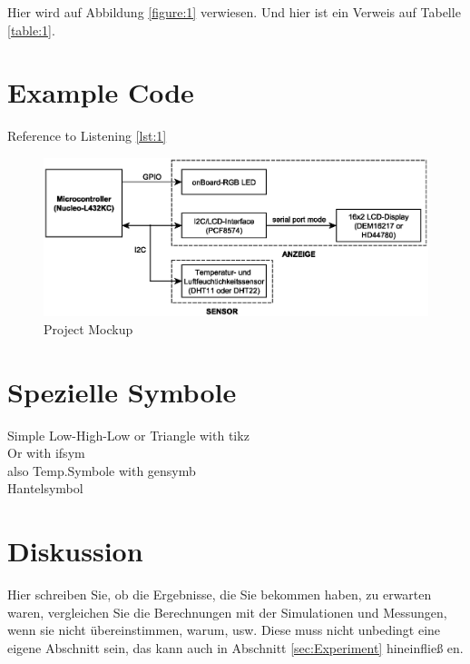 \documentclass[12pt,a4paper]{article}
\begin{document}
	
	Hier wird auf Abbildung \ref{figure:1} verwiesen. Und hier ist ein Verweis auf Tabelle \ref{table:1}.
	

  		
\section{Example Code}
	
	
	 	
	Reference to Listening \ref{lst:1}

\begin{figure}[H]
	\centering
	\includegraphics[width=0.8\linewidth]{Project_Mockup}
	\caption{Project Mockup}
	\label{figure:2}
\end{figure}

\pagebreak

\section{Spezielle Symbole}
Simple Low-High-Low  or Triangle  with tikz \\
Or with ifsym \FallingEdge \\
also Temp.Symbole with gensymb \celsius \space \ohm \\
Hantelsymbol \laplace

\section{Diskussion}
Hier schreiben Sie, ob die Ergebnisse, die Sie bekommen haben, zu erwarten waren, vergleichen Sie die Berechnungen mit der 
Simulationen und Messungen, wenn sie nicht übereinstimmen, warum, usw. Diese muss nicht unbedingt eine eigene Abschnitt sein, 
das kann auch in Abschnitt \ref{sec:Experiment} hineinfließ en.
\end{document}
